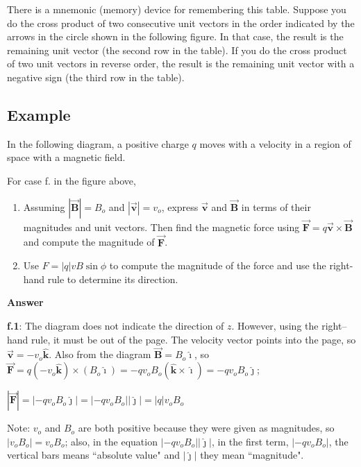 \documentclass{article}
\newcommand{\ihat}[0]{\hat{\boldsymbol{\imath}}}
\newcommand{\jhat}[0]{\hat{\boldsymbol{\jmath}}}
\newcommand{\khat}[0]{\hat{\boldsymbol{k}}}
\newcommand{\bfvec}[1]{\vec{\mathbf{#1}}}
\begin{document}
There is a mnemonic (memory) device for remembering this table. Suppose you do the cross product of two consecutive unit vectors in the order indicated by the arrows in the circle shown in the following figure. In that case, the result is the remaining unit vector (the second row in the table). If you do the cross product of two unit vectors in reverse order, the result is the remaining unit vector with a negative sign (the third row in the table).



\subsection{Example}

In the following diagram, a positive charge $q$ moves with a velocity in a region of space with a magnetic field.



For case f. in the figure above,

\begin{enumerate}

  \item Assuming $|\bfvec{B}|=B_o$ and $|\bfvec{v}|=v_o$, express $\bfvec{v}$ and $\bfvec{B}$ in terms of their magnitudes and unit vectors. Then find the magnetic force using $\bfvec{F} = q\bfvec{v}\times\bfvec{B}$ and compute the magnitude of $\bfvec{F}$.

  \item Use $F = |q|vB\sin\phi$ to compute the magnitude of the force and use the right-hand rule to determine its direction.

\end{enumerate}

\textbf{Answer}

\textbf{f.1}: The diagram does not indicate the direction of $z$. However, using the right--hand rule, it must be out of the page. The velocity vector points into the page, so $\bfvec{v}=-v_o\khat$. Also from the diagram $\bfvec{B}=B_o\ihat$, so $\bfvec{F} = q(-v_o\khat)\times (B_o\ihat)=-qv_oB_o(\khat\times \ihat)=-qv_oB_o\jhat$;

$|\bfvec{F}|=|-qv_oB_o\jhat| = |-qv_oB_o||\jhat|=|q|v_oB_o$

Note: $v_o$ and $B_o$ are both positive because they were given as magnitudes, so $|v_oB_o|=v_oB_o$; also, in the equation $|-qv_oB_o||\jhat|$, in the first term, $|-qv_oB_o|$, the vertical bars means ``absolute value" and $|\jhat|$ they mean ``magnitude".
\end{document}
